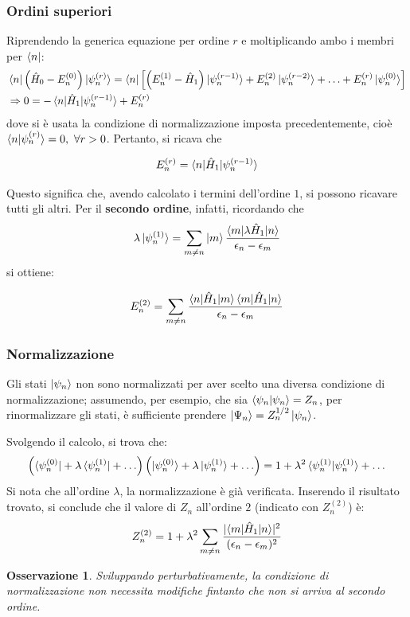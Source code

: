 \documentclass[11pt, a4paper]{scrartcl} %
\numberwithin{equation}{subsection}
\theoremstyle{style2}
\newtheorem{osservazione}{Osservazione}[section]
\theoremstyle{style1}
\newenvironment{boxenv}[1][]{
    \begin{eqbox}[#1]
    }{
   \end{eqbox}
}
\begin{document}
\subsubsection{Ordini superiori}
Riprendendo la generica equazione per ordine $r$ e moltiplicando ambo i membri per $\bra{n} $:
\[
\begin{split}
	&\bra{n} \left(\hat{H}_0 - E^{(0)} _n\right) \ket{\psi ^{(r)} _n} = \bra{n}\left[  \left(E^{(1)} _n - \hat{H}_1\right) \ket{\psi ^{(r-1)} _n} + E^{(2)} _n\ket{\psi ^{(r-2)} _n} + \ldots + E^{(r)} _n \ket{\psi _n^{(0)} } \right]\\
	&\Rightarrow 0 = - \braket{n|\hat{H}_1|\psi ^{(r-1)} _n} + E^{(r)} _n
\end{split}
\] 
dove si \`e usata la condizione di normalizzazione imposta precedentemente, cio\`e $\braket{n|\psi ^{(r)} _n} = 0, \ \forall r > 0$.
Pertanto, si ricava che
\begin{boxenv}[]
	\begin{equation}\label{end1}
	E_n^{(r)} = \braket{n|\hat{H}_1|\psi ^{(r-1)} _n} 
\end{equation}
\end{boxenv}
\noindent Questo significa che, avendo calcolato i termini dell'ordine $1$, si possono ricavare tutti gli altri.
Per il \textbf{secondo ordine}, infatti, ricordando che
\[
\lambda \ket{\psi ^{(1)} _n} = \sum_{m\neq n}^{} \ket{m} \frac{\braket{m|\lambda \hat{H}_1|n} }{\epsilon _n  - \epsilon _m}
\] 
si ottiene:
\begin{boxenv}[]
\begin{equation}
	E^{(2)} _n = \sum_{m\neq n}^{} \frac{\braket{n|\hat{H}_1|m} \braket{m|\hat{H}_1|n} }{\epsilon _n - \epsilon _m}
\end{equation}
\end{boxenv}
\subsubsection{Normalizzazione}
Gli stati $\ket{\psi _n} $ non sono normalizzati per aver scelto una diversa condizione di normalizzazione; assumendo, per esempio, che sia $\braket{\psi _n|\psi _n} = Z_n$, per rinormalizzare gli stati, \`e sufficiente prendere $\ket{\Psi _n} = Z_n^{1 / 2} \ket{\psi _n} $.

Svolgendo il calcolo, si trova che:
\[
\left(\bra{\psi ^{(0)} _n } + \lambda \bra{\psi ^{(1)} _n}  + \ldots\right) \left(\ket{\psi ^{(0)} _n}+ \lambda \ket{\psi _n^{(1)} } + \ldots  \right) = 1 + \lambda ^2 \braket{\psi ^{(1)} _n|\psi ^{(1)} _{n} }  + \ldots 
\] 
Si nota che all'ordine $\lambda $, la normalizzazione \`e gi\`a verificata.
Inserendo il risultato trovato, si conclude che il valore di $Z_n$ all'ordine $2$ (indicato con $Z_n^{(2)} $) \`e:
\begin{equation}
	Z_n^{(2)}  = 1+ \lambda ^2 \sum_{m\neq n}^{} \frac{\lvert \braket{m|\hat{H}_1|n}  \rvert ^2}{(\epsilon _n - \epsilon _m)^2}
\end{equation}
\begin{osservazione}
Sviluppando perturbativamente, la condizione di normalizzazione non necessita modifiche fintanto che non si arriva al secondo ordine.
\end{osservazione}
\end{document}
